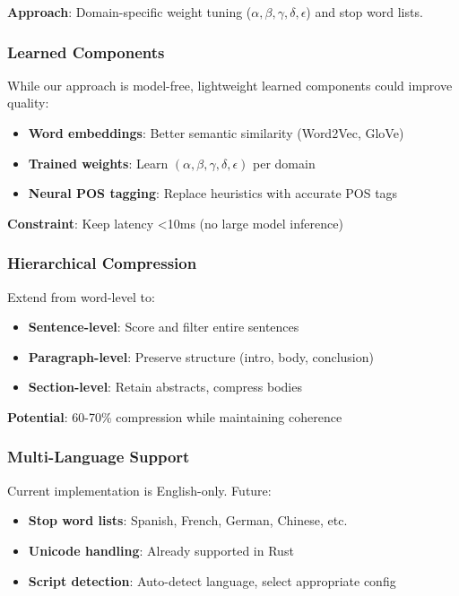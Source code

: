 \textbf{Approach}: Domain-specific weight tuning ($\alpha, \beta, \gamma, \delta, \epsilon$) and stop word lists.

\subsubsection{Learned Components}

While our approach is model-free, lightweight learned components could improve quality:

\begin{itemize}
    \item \textbf{Word embeddings}: Better semantic similarity (Word2Vec, GloVe)
    \item \textbf{Trained weights}: Learn $(\alpha, \beta, \gamma, \delta, \epsilon)$ per domain
    \item \textbf{Neural POS tagging}: Replace heuristics with accurate POS tags
\end{itemize}

\textbf{Constraint}: Keep latency <10ms (no large model inference)

\subsubsection{Hierarchical Compression}

Extend from word-level to:

\begin{itemize}
    \item \textbf{Sentence-level}: Score and filter entire sentences
    \item \textbf{Paragraph-level}: Preserve structure (intro, body, conclusion)
    \item \textbf{Section-level}: Retain abstracts, compress bodies
\end{itemize}

\textbf{Potential}: 60-70\% compression while maintaining coherence

\subsubsection{Multi-Language Support}

Current implementation is English-only. Future:

\begin{itemize}
    \item \textbf{Stop word lists}: Spanish, French, German, Chinese, etc.
    \item \textbf{Unicode handling}: Already supported in Rust
    \item \textbf{Script detection}: Auto-detect language, select appropriate config
\end{itemize}

